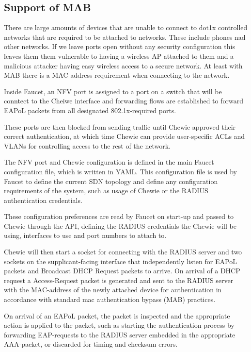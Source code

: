 \subsection{Support of MAB}
There are large amounts of devices that are unable to connect to dot1x controlled networks that are required to be attached to networks. These include phones nad other networks. If we leave ports open without any security configuration this leaves them them vulnerable to having a wireless AP attached to them and a malicious attacker having easy wireless access to a secure network. At least with MAB there is a MAC address requirement when connecting to the network.





Inside Faucet, an NFV port is assigned to a port on a switch that will be conntect to the Cheiwe interface and forwarding flows are established to forward EAPoL packets from all designated 802.1x-required ports.



These ports are then blocked from sending traffic until Chewie approved their correct authentication, at which time Chewie can provide user-specific ACLs and VLANs for controlling access to the rest of the network.

The NFV port and Chewie configuration is defined in the main Faucet configuration file, which is written in YAML. This configuration file is used by Faucet to define the current SDN topology and define any configuration requirements of the system, such as usage of Chewie or the RADIUS authentication credentials.

These configuration preferences are read by Faucet on start-up and passed to Chewie through the API, defining the RADIUS credentials the Chewie will be using, interfaces to use and port numbers to attach to.

Chewie will then start a socket for connecting with the RADIUS server and two sockets on the supplicant-facing interface that independently listen for EAPoL packets and Broadcast DHCP Request packets to arrive.
On arrival of a DHCP request a Access-Request packet is generated and sent to the RADIUS server with the MAC-address of the newly attached device for authentication in accordance with standard mac authentication bypass (MAB) practices. \cite{cisco_mab_setup_guide}

On arrival of an EAPoL packet, the packet is inspected and the appropriate action is applied to the packet, such as starting the authentication process by forwarding EAP-requests to the RADIUS server embedded in the appropriate AAA-packet, or discarded for timing and checksum errors.

